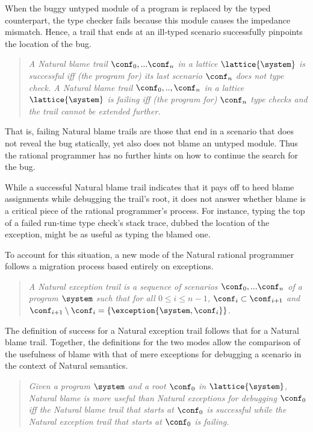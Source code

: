 When the buggy untyped module of a program is replaced by the typed counterpart,
the type checker fails because this module causes the impedance mismatch. Hence, a
trail that ends at an ill-typed scenario successfully pinpoints the location of
the bug. 
\begin{quote}
\it A Natural blame trail $\conf_0,...\conf_n$ in a lattice $\lattice{\system}$ is
\emph{successful} iff (the program for) its last scenario $\conf_n$ does not type check.  A Natural
blame trail $\conf_0,..,\conf_n$ in a lattice $\lattice{\system}$ is \emph{failing}
iff (the program for) $\conf_n$ type checks and the trail cannot be extended further.
\end{quote}
That is, failing Natural blame trails are those that end in a scenario that does not reveal the bug statically, yet also does not blame
an untyped module. Thus the rational programmer has
no further hints on how to continue the search for the bug.

While a successful Natural blame trail indicates that it 
pays off to heed blame assignments while debugging the trail's root, it does not answer whether
blame is a critical piece of the rational programmer's process.  For instance,
typing the top of a failed run-time type check's stack trace, dubbed the
location of the exception, might be as useful as typing the blamed one.

To account for this situation, a new mode of the Natural rational
programmer follows a migration process based entirely on exceptions.
\begin{quote}
\it A {\em Natural exception trail\/} is a sequence of scenarios $\conf_0,...\conf_n$ of a
program $\system$ such that for all $0 \leq i \leq n - 1$, $\conf_i \subset
\conf_{i+1}$ and $\conf_{i+1} \setminus \conf_i = \{\exception{\system, \conf_i}\}$.
\end{quote}

The definition of success for a Natural exception trail follows that for
a Natural blame trail.
Together, the definitions for the two modes allow the comparison of the usefulness of blame 
with that of mere exceptions for debugging a scenario in the context of Natural semantics.
\begin{quote}
\it 
  Given a program $\system$ and a root $\conf_0$ in $\lattice{\system}$,
  Natural blame is \emph{more useful} than Natural exceptions for
  debugging $\conf_0$ iff 
  the Natural blame trail 
  that starts at $\conf_0$ is successful while the Natural exception trail that
  starts at $\conf_0$ is failing.
\end{quote}
